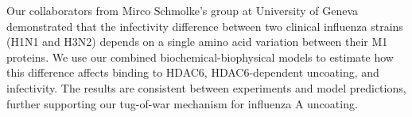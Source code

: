 Our collaborators from Mirco Schmolke's group at University of Geneva demonstrated that the infectivity difference between two clinical influenza strains (H1N1 and H3N2) depends on a single amino acid variation between their M1 proteins. We use our combined biochemical-biophysical models to estimate how this difference affects binding to HDAC6, HDAC6-dependent uncoating, and infectivity. The results are consistent between experiments and model predictions, further supporting our tug-of-war mechanism for influenza A uncoating.